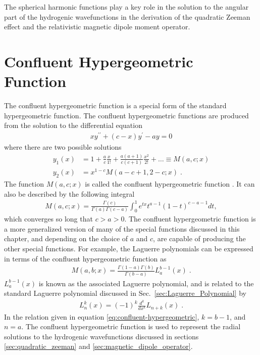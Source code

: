         \noindent The spherical harmonic functions play a key role in the solution to the angular part of the hydrogenic wavefunctions in the derivation of the quadratic Zeeman effect and the relativistic magnetic dipole moment operator.

        \section{Confluent Hypergeometric Function} \label{sec:Confluent_Hypergeometric_Function}
        The confluent hypergeometric function is a special form of the standard hypergeometric function. The confluent hypergeometric functions are produced from the solution to the differential equation 
        \begin{align}
            xy^{\prime \prime} + (c - x)y^\prime - ay = 0
        \end{align}
        \noindent where there are two possible solutions 
        \begin{align}
            y_1(x) &= 1 + \frac{a}{c} \frac{x}{1!} + \frac{a(a+1)}{c(c+1)}\frac{x^2}{2!} + \dots \equiv M(a, c ;x)\\
            y_2(x) &= x^{1-c}M(a-c + 1, 2 - c; x)\;.
        \end{align}
        \noindent The function $M(a, c;x)$ is called the confluent hypergeometric function \cite{Riley_Hobson_Bence_2006}. It can also be described by the following integral 
        \begin{align}
            M(a, c; x) = \frac{\Gamma(c)}{\Gamma(a)\Gamma(c - a)} \int_0^1 e^{tx} t^{a-1} (1 - t)^{c - a - 1} dt,
        \end{align}
        \noindent which converges so long that $c > a > 0$. The confluent hypergeometric function is a more generalized version of many of the special functions discussed in this chapter, and depending on the choice of $a$ and $c$, are capable of producing the other special functions. For example, the Laguerre polynomials can be expressed in terms of the confluent hypergeometric function as 
        \begin{align}
            M(a, b; x) = \frac{\Gamma(1 - a) \Gamma(b)}{\Gamma(b - a)} L_a^{b-1}(x)\;. \label{eq:confluent-hypergeometric}
        \end{align}
        \noindent $L_a^{b-1}(x)$ is known as the associated Laguerre polynomial, and is related to the standard Laguerre polynomial discussed in Sec.~\ref{sec:Laguerre_Polynomial} by 
        \begin{align}
            L_n^k(x) = (-1)^k \frac{d^k}{dx^k} L_{n+k}(x)\;.
        \end{align}
        \noindent In the relation given in equation \eqref{eq:confluent-hypergeometric}, $k = {b-1}$, and $n = a$. The confluent hypergeometric function is used to represent the radial solutions to the hydrogenic wavefunctions discussed in sections \ref{sec:quadratic_zeeman} and \ref{sec:magnetic_dipole_operator}.

